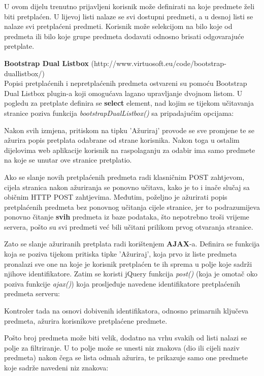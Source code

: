 \documentclass[times, utf8, zavrsni, numeric]{fer}
\begin{document}
U ovom dijelu trenutno prijavljeni korisnik može definirati na koje predmete želi biti pretplaćen. U lijevoj listi nalaze se svi dostupni predmeti, a u desnoj listi se nalaze svi pretplaćeni predmeti. Korisnik može selekcijom na bilo koje od predmeta ili bilo koje grupe predmeta dodavati odnosno brisati odgovarajuće pretplate. 

\textbf{Bootstrap Dual Listbox} (http://www.virtuosoft.eu/code/bootstrap-duallistbox/)\\
Popisi pretplaćenih i nepretplaćenih predmeta ostvareni su pomoću Bootstrap Dual Listbox plugin-a koji omogućava lagano upravljanje dvojnom listom. U pogledu za pretplate definira se \textbf{select} element, nad kojim se tijekom učitavanja stranice poziva funkcija \emph{bootstrapDualListbox()} sa pripadajućim opcijama:

\lstset{style=js}


Nakon svih izmjena, pritiskom na tipku 'Ažuriraj' provode se sve promjene te se ažurira popis pretplata odabrane od strane korisnika. Nakon toga u ostalim dijelovima web aplikacije korisnik na raspolaganju za odabir ima samo predmete na koje se unutar ove stranice pretplatio.

Ako se slanje novih pretplaćenih predmeta radi klasničnim POST zahtjevom, cijela stranica nakon ažuriranja se ponovno učitava, kako je to i inače slučaj sa običnim HTTP POST zahtjevima. Međutim, poželjno je ažurirati popis pretplaćenih predmeta bez ponovnog učitanja cijele stranice, jer to podrazumijeva ponovno čitanje \textbf{svih} predmeta iz baze podataka, što nepotrebno troši vrijeme servera, pošto su svi predmeti već bili učitani prilikom prvog otvaranja stranice.

Zato se slanje ažuriranih pretplata radi korištenjem \textbf{AJAX}-a. Definira se funkcija koja se poziva tijekom pritiska tipke 'Ažuriraj', koja prvo iz liste predmeta pronalazi sve one na koje je korisnik pretplaćen te ih sprema u polje koje sadrži njihove identifikatore. Zatim se koristi jQuery funkcija \emph{post()} (koja je omotač oko poziva funkcije \emph{ajax()}) koja prosljeđuje navedene identifikatore pretplaćenih predmeta serveru:

\lstset{style=js}


Kontroler tada na osnovi dobivenih identifikatora, odnosno primarnih ključeva predmeta, ažurira korisnikove pretplaćene predmete.

Pošto broj predmeta može biti velik, dodatno na vrhu svakih od listi nalazi se polje za filtriranje. U to polje može se unesti niz znakova (dio ili cijeli naziv predmeta) nakon čega se lista odmah ažurira, te prikazuje samo one predmete koje sadrže navedeni niz znakova:
\end{document}
